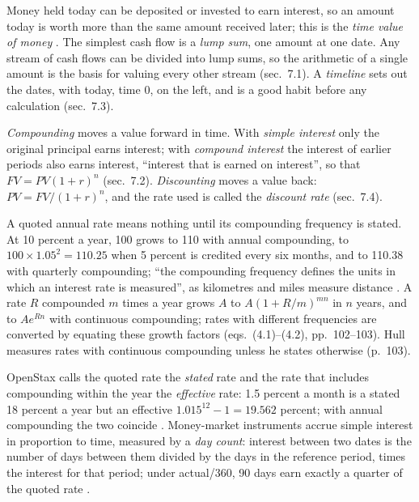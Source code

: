 \begin{qfdefinition}\label{def:time-value-compounding}
 Money held today can be deposited or invested to earn interest, so an amount today is worth more than the same amount received later; this is the \emph{time value of money} \citep[sec.~7.1]{principles-of-finance-2026}. The simplest cash flow is a \emph{lump sum}, one amount at one date. Any stream of cash flows can be divided into lump sums, so the arithmetic of a single amount is the basis for valuing every other stream (sec.~7.1). A \emph{timeline} sets out the dates, with today, time 0, on the left, and is a good habit before any calculation (sec.~7.3).

\emph{Compounding} moves a value forward in time. With \emph{simple interest} only the original principal earns interest; with \emph{compound interest} the interest of earlier periods also earns interest, ``interest that is earned on interest'', so that $FV=PV(1+r)^n$ (sec.~7.2). \emph{Discounting} moves a value back: $PV=FV/(1+r)^n$, and the rate used is called the \emph{discount rate} (sec.~7.4).

A quoted annual rate means nothing until its compounding frequency is stated. At 10 percent a year, 100 grows to 110 with annual compounding, to $100\times1.05^2=110.25$ when 5 percent is credited every six months, and to 110.38 with quarterly compounding; ``the compounding frequency defines the units in which an interest rate is measured'', as kilometres and miles measure distance \citep[chap.~4, sec.~4.4, pp.~101--102]{s7-hulloptions}. A rate $R$ compounded $m$ times a year grows $A$ to $A(1+R/m)^{mn}$ in $n$ years, and to $Ae^{Rn}$ with continuous compounding; rates with different frequencies are converted by equating these growth factors (eqs.~(4.1)--(4.2), pp.~102--103). Hull measures rates with continuous compounding unless he states otherwise (p.~103).

OpenStax calls the quoted rate the \emph{stated} rate and the rate that includes compounding within the year the \emph{effective} rate: 1.5 percent a month is a stated 18 percent a year but an effective $1.015^{12}-1=19.562$ percent; with annual compounding the two coincide \citep[sec.~8.4]{principles-of-finance-2026}. Money-market instruments accrue simple interest in proportion to time, measured by a \emph{day count}: interest between two dates is the number of days between them divided by the days in the reference period, times the interest for that period; under actual/360, 90 days earn exactly a quarter of the quoted rate \citep[chap.~6, sec.~6.1, pp.~152--153]{s7-hulloptions}.


\end{qfdefinition}
